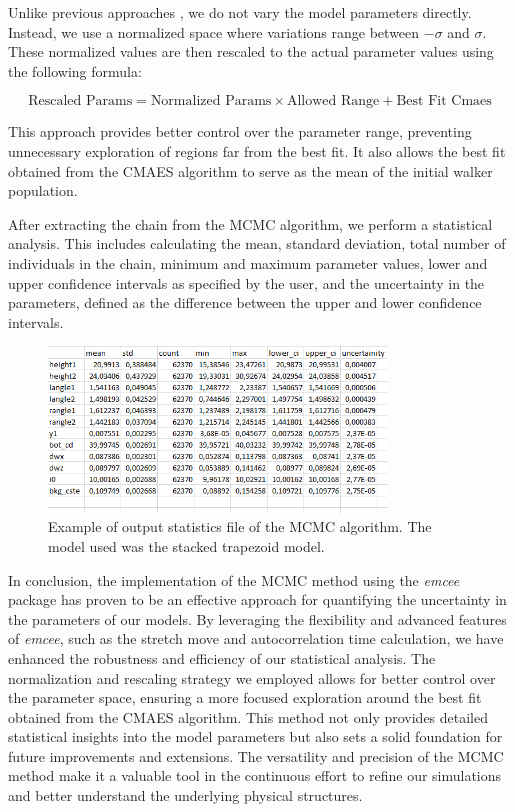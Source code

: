 \medskip

Unlike previous approaches \cite{sunday2016evaluation}, we do not vary the model parameters directly.
Instead, we use a normalized space where variations range between $-\sigma$ and $\sigma$. These 
normalized values are then rescaled to the actual parameter values using the following formula:

\begin{equation}
    \text{Rescaled Params} = \text{Normalized Params} \times \text{Allowed Range} + \text{Best Fit Cmaes}
\end{equation}

This approach provides better control over the parameter range, preventing unnecessary exploration of 
regions far from the best fit. It also allows the best fit obtained from the CMAES algorithm to serve as the mean of the initial walker population.

\medskip

After extracting the chain from the MCMC algorithm, we perform a statistical analysis. This includes calculating 
the mean, standard deviation, total number of individuals in the chain, minimum and maximum parameter values, lower
and upper confidence intervals as specified by the user, and the uncertainty in the parameters, defined as the difference between the upper and lower confidence intervals.

\begin{figure}[h]
    \centering
    \includegraphics[width=0.8\textwidth]{images/mcmc_out.png}
    \caption{Example of output statistics file of the MCMC algorithm. The model used was the stacked trapezoid model.}
\end{figure}

\FloatBarrier

In conclusion, the implementation of the MCMC method using the \textit{emcee} package has proven to be an effective
approach for quantifying the uncertainty in the parameters of our models. By leveraging the flexibility and advanced
features of \textit{emcee}, such as the stretch move and autocorrelation time calculation, we have enhanced the robustness
and efficiency of our statistical analysis. The normalization and rescaling strategy we employed allows for better
control over the parameter space, ensuring a more focused exploration around the best fit obtained from the CMAES
algorithm. This method not only provides detailed statistical insights into the model parameters but also sets 
a solid foundation for future improvements and extensions. The versatility and precision of the MCMC method make 
it a valuable tool in the continuous effort to refine our simulations and better understand the underlying physical structures.


